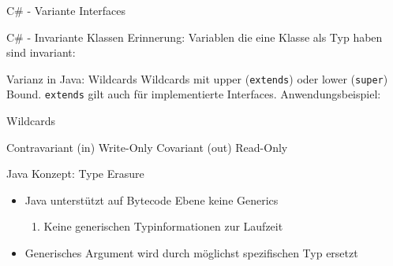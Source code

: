 \documentclass[11pt]{beamer}
\begin{document}
\begin{frame}{C\# - Variante Interfaces}
\end{frame}


\begin{frame}{C\# - Invariante Klassen}
	Erinnerung: 
	Variablen die eine Klasse als Typ haben sind invariant:
\end{frame}

\begin{frame}{Varianz in Java: Wildcards}
		Wildcards mit upper (\texttt{extends}) oder lower (\texttt{super}) Bound. \texttt{extends} gilt auch für implementierte Interfaces.
		Anwendungsbeispiel:
\end{frame}

\begin{frame}{Wildcards}

		Contravariant (\glqq in\grqq{}) Write-Only
	Covariant (\glqq out\grqq{}) Read-Only

\end{frame}


\begin{frame}{Java Konzept: Type Erasure}
	\begin{itemize}
	\item Java unterstützt auf Bytecode Ebene keine Generics
	\begin{enumerate}
		\item Keine generischen Typinformationen zur Laufzeit
	\end{enumerate}
	\item Generisches Argument wird durch möglichst spezifischen Typ ersetzt
	\end{itemize}
\end{frame}




\end{document}
